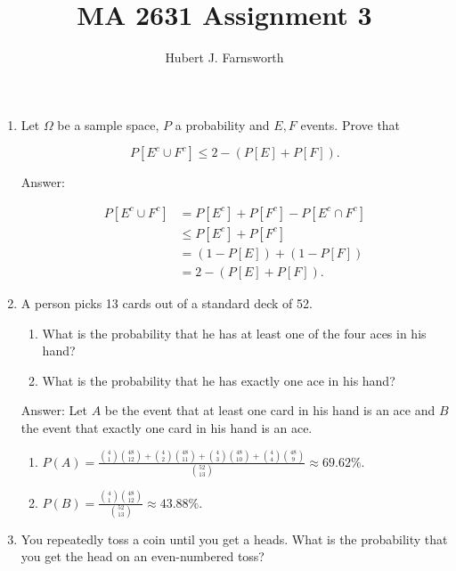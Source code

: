 \documentclass{article}
\title{MA 2631 Assignment 3}
\author{Hubert J. Farnsworth}
\begin{document}
\maketitle

\begin{enumerate}

\item

Let $\Omega$ be a sample space, $P$ a probability and $E, F$ events. Prove that

$$
P[E^c \cup F^c] \leq 2 - (P[E] + P[F]).
$$

Answer:

\begin{align*}
P[E^c \cup F^c]  &= P[E^c] + P[F^c] - P[E^c \cap F^c] \\
& \leq P[E^c] + P[F^c] \\
&= (1- P[E]) + (1- P[F]) \\
&= 2 - (P[E] + P[F]).
\end{align*}

\item

A person picks 13 cards out of a standard deck of 52.

\begin{enumerate}
\item What is the probability that he has at least one of the four aces in his hand?
\item What is the probability that he has exactly one ace in his hand?
\end{enumerate}

Answer: Let $A$ be the event that at least one card in his hand is an ace and $B$ the event that exactly one card in his hand is an ace.

\begin{enumerate}

\item $P(A) = \frac{\binom{4}{1}\binom{48}{12} + \binom{4}{2}\binom{48}{11} + \binom{4}{3}\binom{48}{10} + \binom{4}{4}\binom{48}{9}}{\binom{52}{13}} \approx 69.62\%.$

\item $P(B) = \frac{\binom{4}{1}\binom{48}{12}}{\binom{52}{13}} \approx 43.88\%.$

\end{enumerate}

\item

You repeatedly toss a coin until you get a heads. What is the probability that you get the head on an even-numbered toss?


\end{enumerate}
\end{document}
